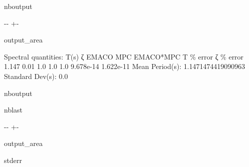 \documentclass[letterpaper,10pt,english]{sphinxmanual}
\begin{document}
\begin{sphinxuseclass}{nboutput}
{

\kern-\sphinxverbatimsmallskipamount\kern-\baselineskip
\kern+\FrameHeightAdjust\kern-\fboxrule
\vspace{\nbsphinxcodecellspacing}

\begin{sphinxuseclass}{output_area}
\begin{sphinxuseclass}{}


\begin{sphinxVerbatim}[commandchars=\\\{\}]
Spectral quantities:
       T(s)        ζ        EMACO      MPC       EMACO*MPC     T \% error    ζ \% error
      1.147      0.01       1.0        1.0        1.0          9.678e-14    1.622e-11
Mean Period(s): 1.1471474419090963
Standard Dev(s): 0.0
\end{sphinxVerbatim}



\end{sphinxuseclass}
\end{sphinxuseclass}
}

\end{sphinxuseclass}
\begin{sphinxuseclass}{nboutput}
\begin{sphinxuseclass}{nblast}
{

\kern-\sphinxverbatimsmallskipamount\kern-\baselineskip
\kern+\FrameHeightAdjust\kern-\fboxrule
\vspace{\nbsphinxcodecellspacing}

\begin{sphinxuseclass}{output_area}
\begin{sphinxuseclass}{stderr}


\begin{sphinxVerbatim}[commandchars=\\\{\}]

\end{sphinxVerbatim}

\end{sphinxuseclass}
\end{sphinxuseclass}
}

\end{sphinxuseclass}
\end{sphinxuseclass}
\end{document}
